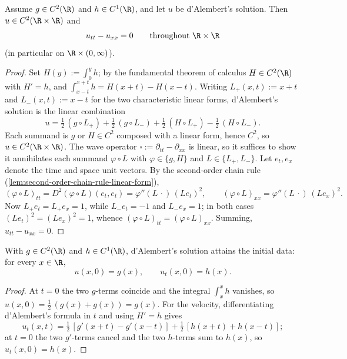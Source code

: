 \begin{theorem}[Solution of wave equation, $n = 1$]
\label{thm:wave-equation-dalembert-solution}
\leanok
Assume $g \in C^2(\R)$ and $h \in C^1(\R)$, and let $u$ be d'Alembert's solution.
Then $u \in C^2(\R \times \R)$ and
$$u_{tt} - u_{xx} = 0 \qquad \text{throughout } \R \times \R$$
(in particular on $\R \times (0,\infty)$).
\end{theorem}
\begin{proof}
\leanok
Set $H(y) := \int_0^y h$; by the fundamental theorem of calculus $H \in C^2(\R)$
with $H' = h$, and $\int_{x-t}^{x+t} h = H(x+t) - H(x-t)$. Writing $L_+(x,t) := x+t$
and $L_-(x,t) := x-t$ for the two characteristic linear forms, d'Alembert's
solution is the linear combination
$$u = \tfrac12\,(g\circ L_+) + \tfrac12\,(g\circ L_-)
      + \tfrac12\,(H\circ L_+) - \tfrac12\,(H\circ L_-).$$
Each summand is $g$ or $H \in C^2$ composed with a linear form, hence $C^2$, so
$u \in C^2(\R\times\R)$. The wave operator $\square := \partial_{tt} - \partial_{xx}$
is linear, so it suffices to show it annihilates each summand $\varphi \circ L$
with $\varphi \in \{g, H\}$ and $L \in \{L_+, L_-\}$. Let $e_t, e_x$ denote the
time and space unit vectors. By the second-order chain rule
(\cref{lem:second-order-chain-rule-linear-form}),
$$(\varphi\circ L)_{tt} = D^2(\varphi\circ L)(e_t,e_t) = \varphi''(L\,\cdot)\,(L e_t)^2,
  \qquad (\varphi\circ L)_{xx} = \varphi''(L\,\cdot)\,(L e_x)^2.$$
Now $L_+ e_t = L_+ e_x = 1$, while $L_- e_t = -1$ and $L_- e_x = 1$; in both cases
$(L e_t)^2 = (L e_x)^2 = 1$, whence $(\varphi\circ L)_{tt} = (\varphi\circ L)_{xx}$.
Summing, $u_{tt} - u_{xx} = 0$.
\end{proof}

\begin{theorem}
\label{thm:dalembert-initial-conditions}
\leanok
With $g \in C^2(\R)$ and $h \in C^1(\R)$, d'Alembert's solution attains the initial
data: for every $x \in \R$,
$$u(x,0) = g(x), \qquad u_t(x,0) = h(x).$$
\end{theorem}
\begin{proof}
\leanok
At $t = 0$ the two $g$-terms coincide and the integral $\int_x^x h$ vanishes, so
$u(x,0) = \tfrac12\,(g(x) + g(x)) = g(x)$. For the velocity, differentiating
d'Alembert's formula in $t$ and using $H' = h$ gives
$$u_t(x,t) = \tfrac12\,[g'(x+t) - g'(x-t)] + \tfrac12\,[h(x+t) + h(x-t)];$$
at $t = 0$ the two $g'$-terms cancel and the two $h$-terms sum to $h(x)$, so
$u_t(x,0) = h(x)$.
\end{proof}

